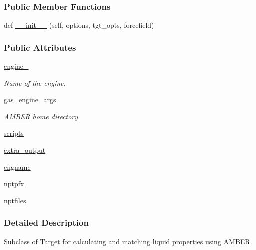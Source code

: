 \subsubsection*{Public Member Functions}
\begin{DoxyCompactItemize}
\item 
def \hyperlink{classsrc_1_1amberio_1_1Liquid__AMBER_a2ef4bb756f0d95903ce9aa7cf31f3f4d}{\+\_\+\+\_\+init\+\_\+\+\_\+} (self, options, tgt\+\_\+opts, forcefield)
\end{DoxyCompactItemize}
\subsubsection*{Public Attributes}
\begin{DoxyCompactItemize}
\item 
\hyperlink{classsrc_1_1amberio_1_1Liquid__AMBER_a13932bea29afd6143dec7a2b1c921aeb}{engine\+\_\+}
\begin{DoxyCompactList}\small\item\em Name of the engine. \end{DoxyCompactList}\item 
\hyperlink{classsrc_1_1amberio_1_1Liquid__AMBER_a29aceac6e46c699374e42bbdc637752d}{gas\+\_\+engine\+\_\+args}
\begin{DoxyCompactList}\small\item\em \hyperlink{classsrc_1_1amberio_1_1AMBER}{A\+M\+B\+ER} home directory. \end{DoxyCompactList}\item 
\hyperlink{classsrc_1_1amberio_1_1Liquid__AMBER_ada8cf969f9c8775971e88af089952697}{scripts}
\item 
\hyperlink{classsrc_1_1amberio_1_1Liquid__AMBER_ae37db9a4e3ab9578287ca3be13a7ba3c}{extra\+\_\+output}
\item 
\hyperlink{classsrc_1_1amberio_1_1Liquid__AMBER_aed0af8153cc5b7b2b2a5f7b0aa320a2f}{engname}
\item 
\hyperlink{classsrc_1_1amberio_1_1Liquid__AMBER_a6603e37671c1f10f1c9f7d606a5ea34b}{nptpfx}
\item 
\hyperlink{classsrc_1_1amberio_1_1Liquid__AMBER_a62b445f0b7b517fc2b801c8d2ba4ecf0}{nptfiles}
\end{DoxyCompactItemize}


\subsubsection{Detailed Description}
Subclass of Target for calculating and matching liquid properties using \hyperlink{classsrc_1_1amberio_1_1AMBER}{A\+M\+B\+ER}. 



